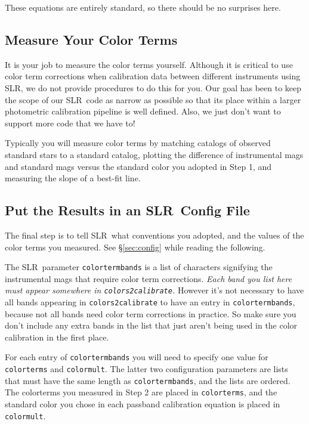 \documentclass{report}
\newcommand{\slr}{SLR}
\begin{document}
These equations are entirely standard, so there should be no surprises
here.




\subsection{Measure Your Color Terms}

It is your job to measure the color terms yourself.  Although it is
critical to use color term corrections when calibration data between
different instruments using \slr, we do not provide procedures to do
this for you.  Our goal has been to keep the scope of our \slr\ code
as narrow as possible so that its place within a larger photometric
calibration pipeline is well defined.  Also, we just don't want to
support more code that we have to!

Typically you will measure color terms by matching catalogs of
observed standard stars to a standard catalog, plotting the difference
of instrumental mags and standard mags versus the standard color you
adopted in Step 1, and measuring the slope of a best-fit line.


\subsection{Put the Results in an \slr\ Config File}

The final step is to tell \slr\ what conventions you adopted, and the
values of the color terms you measured.  See \S\ref{sec:config} while
reading the following.

The \slr\ parameter \verb|colortermbands| is a list of characters
signifying the instrumental mags that require color term corrections.
{\it Each band you list here must appear somewhere in
  \verb|colors2calibrate|.}  However it's not necessary to have all
bands appearing in \verb|colors2calibrate| to have an entry in
\verb|colortermbands|, because not all bands need color term
corrections in practice.  So make sure you don't include any extra
bands in the list that just aren't being used in the color calibration
in the first place.

For each entry of \verb|colortermbands| you will need to specify one
value for \verb|colorterms| and \verb|colormult|.  The latter two
configuration parameters are lists that must have the same length as
\verb|colortermbands|, and the lists are ordered.  The colorterms you
measured in Step 2 are placed in \verb|colorterms|, and the standard
color you chose in each passband calibration equation is placed in
\verb|colormult|.  
\end{document}
